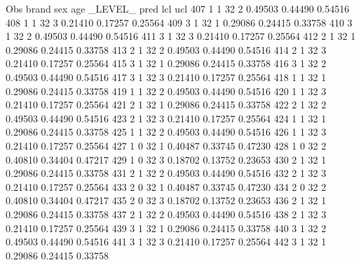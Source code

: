 \documentclass{article}
\begin{document}
\begin{Woutput}
 Obs    brand    sex    age    _LEVEL_      pred       lcl        ucl
 407      1       1      32       2       0.49503    0.44490    0.54516
 408      1       1      32       3       0.21410    0.17257    0.25564
 409      3       1      32       1       0.29086    0.24415    0.33758
 410      3       1      32       2       0.49503    0.44490    0.54516
 411      3       1      32       3       0.21410    0.17257    0.25564
 412      2       1      32       1       0.29086    0.24415    0.33758
 413      2       1      32       2       0.49503    0.44490    0.54516
 414      2       1      32       3       0.21410    0.17257    0.25564
 415      3       1      32       1       0.29086    0.24415    0.33758
 416      3       1      32       2       0.49503    0.44490    0.54516
 417      3       1      32       3       0.21410    0.17257    0.25564
 418      1       1      32       1       0.29086    0.24415    0.33758
 419      1       1      32       2       0.49503    0.44490    0.54516
 420      1       1      32       3       0.21410    0.17257    0.25564
 421      2       1      32       1       0.29086    0.24415    0.33758
 422      2       1      32       2       0.49503    0.44490    0.54516
 423      2       1      32       3       0.21410    0.17257    0.25564
 424      1       1      32       1       0.29086    0.24415    0.33758
 425      1       1      32       2       0.49503    0.44490    0.54516
 426      1       1      32       3       0.21410    0.17257    0.25564
 427      1       0      32       1       0.40487    0.33745    0.47230
 428      1       0      32       2       0.40810    0.34404    0.47217
 429      1       0      32       3       0.18702    0.13752    0.23653
 430      2       1      32       1       0.29086    0.24415    0.33758
 431      2       1      32       2       0.49503    0.44490    0.54516
 432      2       1      32       3       0.21410    0.17257    0.25564
 433      2       0      32       1       0.40487    0.33745    0.47230
 434      2       0      32       2       0.40810    0.34404    0.47217
 435      2       0      32       3       0.18702    0.13752    0.23653
 436      2       1      32       1       0.29086    0.24415    0.33758
 437      2       1      32       2       0.49503    0.44490    0.54516
 438      2       1      32       3       0.21410    0.17257    0.25564
 439      3       1      32       1       0.29086    0.24415    0.33758
 440      3       1      32       2       0.49503    0.44490    0.54516
 441      3       1      32       3       0.21410    0.17257    0.25564
 442      3       1      32       1       0.29086    0.24415    0.33758

\end{Woutput}
\end{document}
